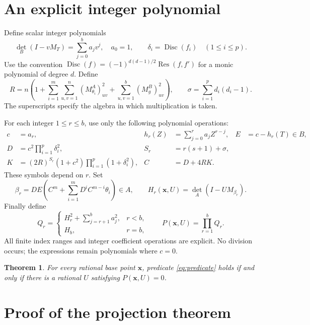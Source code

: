 \documentclass[11pt,a4paper]{article}
\newtheorem{theorem}{Theorem}[section]
\DeclareMathOperator{\Res}{Res}\DeclareMathOperator{\Disc}{Disc}
\begin{document}
\section{An explicit integer polynomial}

Define scalar integer polynomials
\[
 \det_B(I-vM_T)=\sum_{j=0}^b a_jv^j,\quad a_0=1,
 \qquad \delta_i=\Disc(f_i)\quad(1\le i\le p).
\]
Use the convention
$\Disc(f)=(-1)^{d(d-1)/2}\Res(f,f')$ for a monic polynomial
of degree $d$. Define
\begin{equation}\label{eq:rootbound}
 R=n\left(1+\sum_{i=1}^m\sum_{u,v=1}^n
                 (M_{\theta_i}^{A})_{uv}^2
            +\sum_{u,v=1}^b(M_g^{B})_{uv}^2\right),
 \qquad \sigma=\sum_{i=1}^p d_i(d_i-1).
\end{equation}
The superscripts specify the algebra in which multiplication is taken.

For each integer $1\le r\le b$, use only the following polynomial
operations:
\begin{align*}
 c&=a_r,& h_r(Z)&=\sum_{j=0}^r a_jZ^{r-j},& E&=c-h_r(T)\in B,\\
 D&=c^2\prod_{i=1}^p\delta_i^2,& S_r&=r(s+1)+\sigma,\\
 K&=(2R)^{S_r}(1+c^2)\prod_{i=1}^p(1+\delta_i^2),& C&=D+4RK.
\end{align*}
These symbols depend on $r$. Set
\begin{equation}\label{eq:beta}
 \beta_r=DE\left(C^m+\sum_{i=1}^mD^iC^{m-i}\theta_i\right)\in A,
 \qquad H_r(\mathbf x,U)=\det_A(I-UM_{\beta_r}).
\end{equation}
Finally define
\begin{equation}\label{eq:product}
 Q_r=\begin{cases}
 H_r^2+\displaystyle\sum_{j=r+1}^b a_j^2,&r<b,\\
 H_b,&r=b,
 \end{cases}
 \qquad P(\mathbf x,U)=\prod_{r=1}^b Q_r.
\end{equation}
All finite index ranges and integer coefficient operations are explicit.
No division occurs; the expressions remain polynomials where $c=0$.

\begin{theorem}\label{thm:main}
For every rational base point $\mathbf x$, predicate
\eqref{eq:predicate} holds if and only if there is a rational
$U$ satisfying $P(\mathbf x,U)=0$.
\end{theorem}

\section{Proof of the projection theorem}
\end{document}
